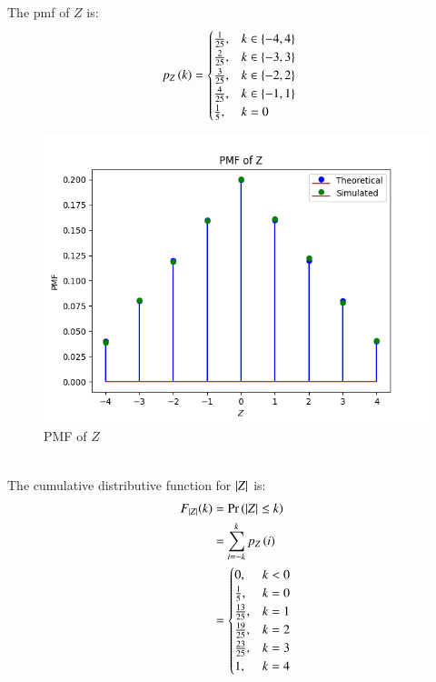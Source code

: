 \documentclass[journal,12pt,onecolumn]{IEEEtran}
\theoremstyle{remark}
\begin{document}
The pmf of $Z$	 is:
\begin{align}
	p_Z\left(k\right) &=
	\begin{cases}
		\frac{1}{25}, & k \in \left\{-4,4\right\}\\
		\frac{2}{25}, & k \in \left\{-3,3\right\}\\
		\frac{3}{25}, & k \in \left\{-2,2\right\}\\
		\frac{4}{25}, & k \in \left\{-1,1\right\}\\
		\frac{1}{5}, & k = 0
	\end{cases}
\end{align}
\begin{figure}[!ht]
\centering
\includegraphics[width=\columnwidth]{./figs/figure1.png}
\caption{PMF of $Z$}
\end{figure}
\\
The cumulative distributive function for $\left\vert Z\right\vert$ is:
\begin{align}
	F_{\left\vert Z\right\vert}(k) &= \Pr\left(\left\vert Z\right\vert \leq k\right)\\
	&= \sum_{i = -k}^{k} p_Z\left(i\right)\\
	&= \begin{cases}
		0, & k < 0\\
		\frac{1}{5}, & k = 0\\
		\frac{13}{25}, & k = 1\\
		\frac{19}{25}, & k = 2\\
		\frac{23}{25}, & k = 3\\
		1, & k = 4
	\end{cases} 
\end{align}
\end{document}
